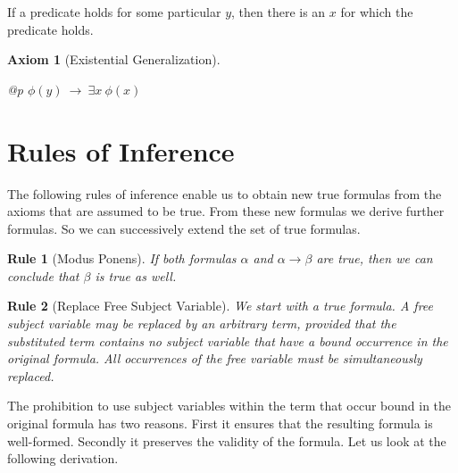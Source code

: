 \documentclass[a4paper,german,10pt,twoside]{book}
\newtheorem{ax}{Axiom}
\newtheorem{rul}{Rule}
\theoremstyle{definition}
\theoremstyle{remark}
\begin{document}
\par
If a predicate holds for some particular $y$, then there is an $x$ for which the predicate holds.

\begin{ax}[Existential Generalization]
\label{axiom:existencialGeneralization} \hypertarget{axiom:existencialGeneralization}{}
\mbox{}
\begin{longtable}{{@{\extracolsep{\fill}}p{\linewidth}}}
\centering $\phi(y)\ \rightarrow \ \exists x\ \phi(x)$
\end{longtable}

\end{ax}




\section{Rules of Inference} \label{chapter4_section1} \hypertarget{chapter4_section1}{}
The following rules of inference enable us to obtain new true formulas from the axioms that are assumed to be true. From these new formulas we derive further formulas. So we can successively extend the set of true formulas.

\par


\begin{rul}[Modus Ponens]
\label{rule:modusPonens} \hypertarget{rule:modusPonens}{}
If both formulas $\alpha$ and $\alpha \rightarrow \beta$ are true, then we can conclude that $\beta$ is true as well.
\end{rul}




\par


\begin{rul}[Replace Free Subject Variable]
\label{rule:replaceFree} \hypertarget{rule:replaceFree}{}
We start with a true formula.
A free subject variable may be replaced by an arbitrary term, provided that the substituted term contains no subject variable that have a bound occurrence in the original formula. All occurrences of the free variable must be simultaneously replaced.
\end{rul}

The prohibition to use subject variables within the term that occur bound in the original formula has two reasons. First it ensures that the resulting formula is well-formed. Secondly it preserves the validity of the formula. Let us look at the following derivation.
\end{document}
